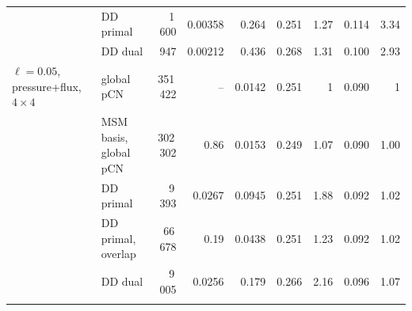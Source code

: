 \begin{tabular}{llrrrrrrr}
 & DD primal & 1\,600 & 0.00358 & 0.264 & 0.251 & 1.27 & 0.114 & 3.34 \\
 & DD dual & 947 & 0.00212 & 0.436 & 0.268 & 1.31 & 0.100 & 2.93 \\
\addlinespace
$\ell=0.05$, pressure+flux, $4\times4$ & global pCN & 351\,422 & -- & 0.0142 & 0.251 & 1 & 0.090 & 1 \\
 & MSM basis, global pCN & 302\,302 & 0.86 & 0.0153 & 0.249 & 1.07 & 0.090 & 1.00 \\
 & DD primal & 9\,393 & 0.0267 & 0.0945 & 0.251 & 1.88 & 0.092 & 1.02 \\
 & DD primal, overlap & 66\,678 & 0.19 & 0.0438 & 0.251 & 1.23 & 0.092 & 1.02 \\
 & DD dual & 9\,005 & 0.0256 & 0.179 & 0.266 & 2.16 & 0.096 & 1.07 \\
\addlinespace
\bottomrule
\end{tabular}
